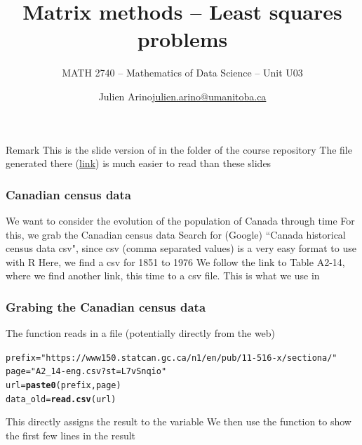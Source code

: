 \documentclass[aspectratio=169]{beamer}\usepackage[]{graphicx}\usepackage[]{xcolor}
\subtitle{MATH 2740 -- Mathematics of Data Science -- Unit U03}
\author{\texorpdfstring{Julien Arino\newline\url{julien.arino@umanitoba.ca}}{Julien Arino}}
\institute{Department of Mathematics @ University of Manitoba}
\title{Matrix methods -- Least squares problems}
\makeatletter
\newcommand{\hlsng}[1]{\textcolor[rgb]{0.192,0.494,0.8}{#1}}%
\newcommand{\hldef}[1]{\textcolor[rgb]{0.345,0.345,0.345}{#1}}%
\newcommand{\hlkwb}[1]{\textcolor[rgb]{0.69,0.353,0.396}{#1}}%
\newcommand{\hlkwd}[1]{\textcolor[rgb]{0.737,0.353,0.396}{\textbf{#1}}}%
\newenvironment{kframe}{%
 \def\at@end@of@kframe{}%
 \ifinner\ifhmode%
  \def\at@end@of@kframe{\end{minipage}}%
  \begin{minipage}{\columnwidth}%
 \fi\fi%
 \def\FrameCommand##1{\hskip\@totalleftmargin \hskip-\fboxsep
 \colorbox{shadecolor}{##1}\hskip-\fboxsep
     \hskip-\linewidth \hskip-\@totalleftmargin \hskip\columnwidth}%
 \MakeFramed {\advance\hsize-\width
   \@totalleftmargin\z@ \linewidth\hsize
   \@setminipage}}%
 {\par\unskip\endMakeFramed%
 \at@end@of@kframe}
\newenvironment{knitrout}{}{} %
\makeatother
\begin{document}

\SStitlepage
\SSoutlinepage



\begin{frame}{Remark}
This is the slide version of  in the folder  of the course repository
\vfill
The  file generated there (\href{https://julien-arino.github.io/math-of-data-science/CODE/Canada-census-get-plot-data.html}{link}) is much easier to read than these slides
\end{frame}

\begin{frame}\frametitle{Canadian census data}
We want to consider the evolution of the population of Canada through time
\vfill
For this, we grab the Canadian census data
\vfill Search for (Google) ``Canada historical census data csv", since csv (comma separated values) is a very easy format to use with R
\vfill
Here, we find a csv for 1851 to 1976
\vfill
We follow the link to Table A2-14, where we find another link, this time to a csv file. This is what we use in 
\end{frame}


\begin{frame}[fragile]
\frametitle{Grabing the Canadian census data}
The function  reads in a file (potentially directly from the web)
\vfill
\begin{knitrout}
\color{fgcolor}\begin{kframe}
\begin{alltt}
\hldef{prefix} \hlkwb{=} \hlsng{"https://www150.statcan.gc.ca/n1/en/pub/11-516-x/sectiona/"}
\hldef{page} \hlkwb{=} \hlsng{"A2_14-eng.csv?st=L7vSnqio"}
\hldef{url} \hlkwb{=} \hlkwd{paste0}\hldef{(prefix, page)}
\hldef{data_old} \hlkwb{=} \hlkwd{read.csv}\hldef{(url)}
\end{alltt}
\end{kframe}
\end{knitrout}
\vfill
This directly assigns the result to the variable 
\vfill
We then use the function  to show the first few lines in the result
\end{frame}
\end{document}
